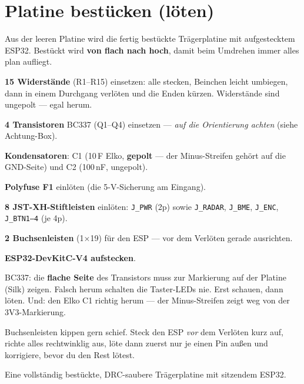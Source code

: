 \section{Platine bestücken (löten)}
\begin{ziel}
Aus der leeren Platine wird die fertig bestückte Trägerplatine mit aufgestecktem ESP32.
Bestückt wird \textbf{von flach nach hoch}, damit beim Umdrehen immer alles plan aufliegt.
\end{ziel}
\begin{schritte}
  \item \textbf{15 Widerstände} (R1–R15) einsetzen: alle stecken, Beinchen leicht umbiegen,
        dann in einem Durchgang verlöten und die Enden kürzen. Widerstände sind ungepolt —
        egal herum.
  \item \textbf{4 Transistoren} BC337 (Q1–Q4) einsetzen — \emph{auf die Orientierung achten}
        (siehe Achtung-Box).
  \item \textbf{Kondensatoren}: C1 (10\,\textmu F Elko, \textbf{gepolt} — der Minus-Streifen
        gehört auf die GND-Seite) und C2 (100\,nF, ungepolt).
  \item \textbf{Polyfuse F1} einlöten (die 5-V-Sicherung am Eingang).
  \item \textbf{8 JST-XH-Stiftleisten} einlöten: \texttt{J\_PWR} (2p) sowie \texttt{J\_RADAR},
        \texttt{J\_BME}, \texttt{J\_ENC}, \texttt{J\_BTN1--4} (je 4p).
  \item \textbf{2 Buchsenleisten} (1×19) für den ESP — vor dem Verlöten gerade ausrichten.
  \item \textbf{ESP32-DevKitC-V4 aufstecken}.
\end{schritte}
\begin{achtung}
BC337: die \textbf{flache Seite} des Transistors muss zur Markierung auf der Platine
(Silk) zeigen. Falsch herum schalten die Taster-LEDs nie. Erst schauen, dann löten. Und:
den Elko C1 richtig herum — der Minus-Streifen zeigt weg von der 3V3-Markierung.
\end{achtung}
\begin{tipp}
Buchsenleisten kippen gern schief. Steck den ESP \emph{vor} dem Verlöten kurz auf, richte
alles rechtwinklig aus, löte dann zuerst nur je einen Pin außen und korrigiere, bevor du
den Rest lötest.
\end{tipp}
\begin{ergebnis}
Eine vollständig bestückte, DRC-saubere Trägerplatine mit sitzendem ESP32.
\end{ergebnis}

